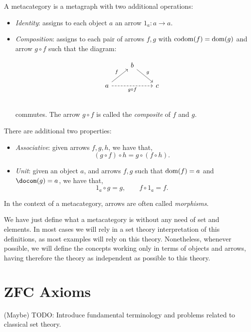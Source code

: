 \begin{definition}
  A metacategory  is a metagraph with two additional operations:
  \begin{itemize}
  \item \emph{Identity}: assigns to each object $a$ an arrow $1_a:a\to a$. 
  \item \emph{Composition}: assigns to each pair of arrows $f,g$ with $\operatorname{codom}(f)=\operatorname{dom}(g)$ and arrow $g\circ f$ such that the diagram:

    \[
      \begin{tikzcd}
        & b \arrow[rd, "g"]& \\
        a\arrow[ru, "f"] \arrow[rr, "g\circ f",swap, dashed] && c\\
      \end{tikzcd}
    \]

    commutes. The arrow $g\circ f$ is called the \emph{composite} of $f$  and $g$.
  \end{itemize}

  There are additional two properties:
  \begin{itemize}
  \item \emph{Associative}: given arrows $f,g,h$, we have that,
    $$(g\circ f) \circ h = g \circ (f \circ h).$$
  \item \emph{Unit}: given an object $a$, and arrows $f,g$ such that $\operatorname{dom} (f)= a$ and $\docom (g) = a$, we have that,
    $$1_a \circ g = g, \qquad f \circ 1_a = f.$$
  \end{itemize}
  In the context of a metacategory, arrows are often called \emph{morphisms}.
\end{definition}

We have just define what a  metacategory is without any need of set and elements. In most cases we will rely in a set theory interpretation of this definitions, as most examples will rely on this theory. Nonetheless, whenever possible, we will define the concepts working only in terms of objects and arrows, having therefore the theory as independent as possible to this theory.




\section{ZFC Axioms}
{\color{red}(Maybe) TODO}: Introduce fundamental terminology and problems related to classical set theory.\\

